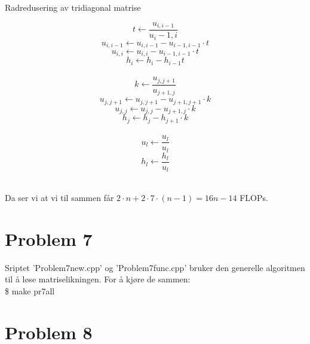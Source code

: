 \documentclass[english,notitlepage]{revtex4-1}  %
\begin{document}
\begin{algorithm}[H]
	\caption{Radredusering av tridiagonal matrise}\label{algo:midpoint_rule}
	\begin{algorithmic}
		 
		\State $$t\leftarrow \frac{u_{i,i-1}}{u{_i-1,i}}$$ 
		$$
		u_{i,i-1}\leftarrow u_{i,i-1}-u_{i-1,i-1} \cdot t
		$$ 
		$$
		u_{i,i}\leftarrow u_{i,i}-u_{i-1,i-1}\cdot t
		$$ 
		$$
		h_i\leftarrow h_i-h_{i-1} t
		$$  \\
		\EndFor
		 
		\State $$k\leftarrow \frac{u_{j,j+1}}{u_{j+1,j}}$$ 
		$$
		u_{j,j+1}\leftarrow u_{j,j+1}-u_{j+1,j+1}\cdot k
		$$ 
		$$
		u_{j,j}\leftarrow u_{j,j}-u_{j+1,j}\cdot k
		$$ 
		$$
		h_j\leftarrow h_j-h_{j+1}\cdot k
		$$  \\
		\EndFor
		 
		\State $$
		u_l \leftarrow \frac{u_l}{u_l}$$ 
		$$
		h_l\leftarrow \frac{h_l}{u_l}
		$$  \\
		\EndFor
	\end{algorithmic}
\end{algorithm}
Da ser vi at vi til sammen får $2\cdot n+ 2\cdot 7\cdot (n-1)=16n-14$ FLOPs.











\section*{Problem 7}

Sriptet 'Problem7new.cpp' og 'Problem7func.cpp' bruker den generelle algoritmen  til å løse matriselikningen. For å kjøre de sammen: \\

\$ make pr7all

\section*{Problem 8}
\end{document}
